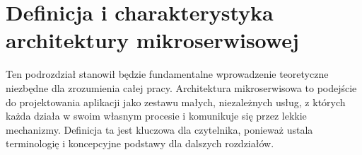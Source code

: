 
\section{Definicja i charakterystyka architektury mikroserwisowej}
\label{sec:DefinicjaMikroserwisow}

Ten podrozdział stanowił będzie fundamentalne wprowadzenie teoretyczne niezbędne dla zrozumienia całej pracy. Architektura mikroserwisowa to podejście do projektowania aplikacji jako zestawu małych, niezależnych usług, z których każda działa w swoim własnym procesie i komunikuje się przez lekkie mechanizmy. Definicja ta jest kluczowa dla czytelnika, ponieważ ustala terminologię i koncepcyjne podstawy dla dalszych rozdziałów.

